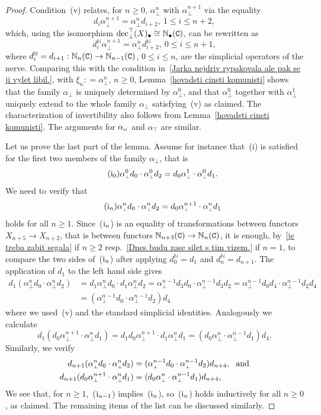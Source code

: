 \documentclass[12pt,leqno]{amsart}
\theoremstyle{definition}
\def\dn{d^{\mathbb N}}
\def\uldec{{\rm dec}_{\bot}^{\top}}
\def\atop{\alpha_{\scriptscriptstyle\top}}
\def\abot{\alpha_{\scriptscriptstyle\bot}}
\def\amix{\alpha_{\scriptscriptstyle{\it{m}}}}
\newcommand{\C}{{\tt C}}
\newcommand{\NN}{\mathbb{N}}
\newcommand{\4}{\texttt{4}}
\begin{document}
\begin{proof}
Condition~(v) relates, for $n \geq 0$, $\abot^n$ with $\abot^{n+1}$
via the equality
\[
d_i \abot^{n+1}=\abot^n d_{i+2},\ 1  \leq i \leq n+2,
\]
which, using the isomorphism 
$\uldec( X)_\bullet \cong \NN_\bullet(\C)$, can be
rewritten as
\[
\dn_i \abot^{n+1}=\abot^n \dn_{i+2},\ 0  \leq i \leq n+1,
\]   
where $\dn_i = d_{i+1}: \NN_n(\C) \to  \NN_{n-1}(\C)$, $0\leq i \leq n$,  
are the simplicial operators of the nerve. Comparing this
with the condition in~\eqref{Jarka nejdriv rypakovala ale pak se ji vylet
  libil.},  with $\xi_n : =
\abot^n$, $n \geq 0$, Lemma~\ref{hovadsti cinsti komunisti} shows that 
the family $\abot$ is uniquely determined by $\abot^0$,
and that $\abot^0$ together with $\abot^1$ uniquely extend to the whole family
$\abot$ satisfying~(v) as claimed. The characterization of
invertibility also follows from  Lemma~\ref{hovadsti cinsti komunisti}. 
The arguments for $\amix$ and $\atop$ are similar.   

Let us prove the last part of the lemma. Assume for instance that~(i)
is satisfied for the first two members of the family $\abot$,
that is
\[
\tag{${\rm i}_0$}
\abot^0d_0 \cdot \abot^0 d_2 = d_0 \abot^{1} \cdot \abot^0 d_1.
\] 
We need to verify that 
\[ 
\tag{${\rm i}_n$}
\abot^nd_0 \cdot \abot^n d_2 = d_0 \abot^{n+1} \cdot \abot^n d_1
\]
holds for all $n \geq 1$. Since~(${\rm i}_n$) is an equality 
of transformations between functors $X_{n+5} \to
X_{n+2}$, that is between functors 
$\NN_{n+3}(\C) \to \NN_{n}(\C)$, it is enough,
by~\eqref{je treba zabit segala} if $n \geq 2$ resp.~\eqref{Dnes budu
  zase silet s tim vizem.} if $n=1$, to compare the two sides
of~(${\rm i}_n$) after
applying $\dn_0 = d_1$ and $\dn_n = d_{n+1}$. The application
of $d_1$ to the left hand side gives 
\begin{align*}
d_1(\abot^nd_0 \cdot \abot^n d_2) &= d_1\abot^nd_0 \cdot d_1\abot^n d_2
=
\abot^{n-1} d_3d_0 \cdot \abot^{n-1} d_3 d_2
=
\abot^{n-1} d_0d_4 \cdot \abot^{n-1} d_2d_4 
\\
&=
(\abot^{n-1} d_0 \cdot \abot^{n-1} d_2)d_4 
\end{align*}
where we used~(v) and the standard simplicial identities. 
Analogously we calculate 
\[
d_1(d_0 \abot^{n+1} \cdot \abot^n d_1) = d_1d_0 \abot^{n+1} \cdot 
d_1\abot^n d_1 = (d_0 \abot^n \cdot \abot^{n-1} d_1)d_4.
\]
Similarly, we verify
\begin{align*}
d_{n+1}(\abot^nd_0 \cdot \abot^n d_2) &= (\abot^{n-1}d_0 \cdot
                                        \abot^{n-1} d_2)d_{n+4}, \
                                        \hbox { and}
\\
d_{n+1}(d_0 \abot^{n+1} \cdot \abot^n d_1) &= 
(d_0 \abot^{n} \cdot
                                             \abot^{n-1} d_1)d_{n+4},
\end{align*}
We see that, for $n \geq 1$,~(${\rm i}_{n-1}$) implies~(${\rm
  i}_{n}$), so~(${\rm i}_{n}$) holds inductively for all $n \geq0$, as
claimed. The remaining items of the list can be discussed similarly.
\end{proof}
\end{document}

